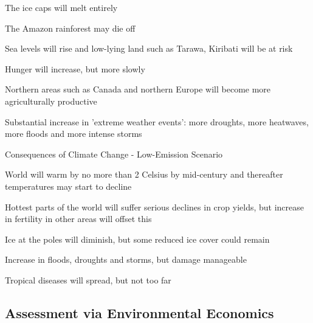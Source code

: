 	The ice caps will melt entirely

	The Amazon rainforest may die off






%

	 Sea levels will rise and low-lying land such as Tarawa, Kiribati will be at risk
%

	 Hunger will increase, but more slowly
%

	 Northern areas such as Canada and northern Europe will become more agriculturally productive
%

	 Substantial increase in 'extreme weather events': more droughts, more heatwaves, more floods and more intense storms

{Consequences of Climate Change - Low-Emission Scenario }






	World will warm by no more than 2 Celsius by mid-century and thereafter temperatures may start to decline

	Hottest parts of the world will suffer serious declines in crop yields, but increase in fertility in other areas will offset this

	Ice at the poles will diminish, but some reduced ice cover could remain

	Increase in floods, droughts and storms, but damage manageable

	Tropical diseases will spread, but not too far






\subsection{Assessment via Environmental Economics}



